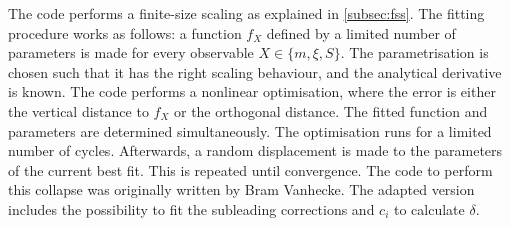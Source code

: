 The code performs a finite-size scaling as explained in \cref{subsec:fss}. The fitting procedure works as follows: a function $f_X$ defined by a limited number of parameters is made for every observable $X \in \{ m , \xi, S \}$. The parametrisation is chosen such that it has the right scaling behaviour, and the analytical derivative is known. The code performs a nonlinear optimisation, where the error is either the vertical distance to $f_X$ or the orthogonal distance. The fitted function and parameters are determined simultaneously. The optimisation runs for a limited number of cycles. Afterwards, a random displacement is made to the parameters of the current best fit. This is repeated until convergence. The code to perform this collapse was originally written by Bram Vanhecke. The adapted version includes the possibility to fit the subleading corrections and $c_i$ to calculate $\delta$.